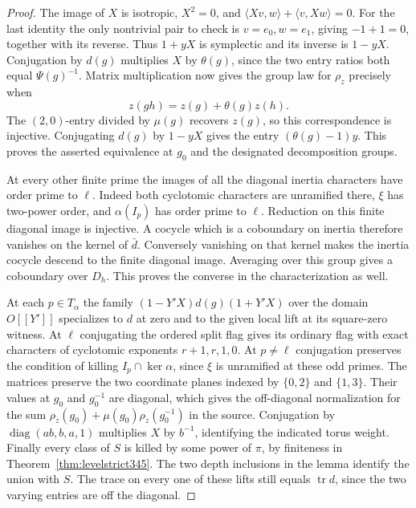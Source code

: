 \documentclass[a4paper,11pt]{article}
\theoremstyle{definition}
\theoremstyle{remark}
\numberwithin{equation}{section}
\begin{document}
\begin{proof}
The image of \(X\) is isotropic, \(X^2=0\), and
\(\langle Xv,w\rangle+\langle v,Xw\rangle=0\). For the last
identity the only nontrivial pair to check is \(v=e_0,w=e_1\),
giving \(-1+1=0\), together with its reverse. Thus
\(1+yX\) is symplectic and its inverse is \(1-yX\).
Conjugation by \(d(g)\) multiplies \(X\) by
\(\theta(g)\), since the two entry ratios both equal
\(\Psi(g)^{-1}\). Matrix multiplication now gives the
group law for \(\rho_z\) precisely when
\[
                   z(gh)=z(g)+\theta(g)z(h).
\]
The \((2,0)\)-entry divided by \(\mu(g)\) recovers \(z(g)\),
so this correspondence is injective. Conjugating \(d(g)\)
by \(1-yX\) gives the entry \((\theta(g)-1)y\).
This proves the asserted equivalence at \(g_0\) and the
designated decomposition groups.

At every other finite prime the images of all the diagonal
inertia characters have order prime to \(\ell\). Indeed both
cyclotomic characters are unramified there, \(\xi\) has
two-power order, and \(\alpha(I_p)\) has order prime to
\(\ell\). Reduction on this finite diagonal image is
injective. A cocycle which is a coboundary on inertia
therefore vanishes on the kernel of \(\bar d\). Conversely
vanishing on that kernel makes the inertia cocycle descend
to the finite diagonal image. Averaging over this group
gives a coboundary over \(D_h\). This proves the converse in
the characterization as well.

At each \(p\in T_\alpha\) the family
\((1-Y'X)d(g)(1+Y'X)\) over the domain \(O[[Y']]\)
specializes to \(d\) at zero and to the given local lift
at its square-zero witness. At \(\ell\) conjugating the
ordered split flag gives its ordinary flag with exact
characters of cyclotomic exponents \(r+1,r,1,0\).
At \(p\ne\ell\) conjugation preserves the condition of
killing \(I_p\cap\ker\alpha\), since \(\xi\) is unramified
at these odd primes. The matrices preserve the two coordinate
planes indexed by \(\{0,2\}\) and \(\{1,3\}\). Their values
at \(g_0\) and \(g_0^{-1}\) are diagonal, which gives the
off-diagonal normalization for the sum
\(\rho_z(g_0)+\mu(g_0)\rho_z(g_0^{-1})\) in the source.
Conjugation by \(\operatorname{diag}(ab,b,a,1)\) multiplies
\(X\) by \(b^{-1}\), identifying the indicated torus weight.
Finally every class of \(S\) is killed by some power of
\(\pi\), by finiteness in Theorem~\ref{thm:levelstrict345}.
The two depth inclusions in the lemma identify the union
with \(S\). The trace on every one of these lifts still
equals \(\operatorname{tr}d\), since the two varying entries
are off the diagonal.
\end{proof}
\end{document}
